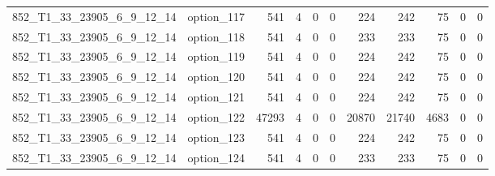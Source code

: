 \begin{tabular}{llrrrrrrrrr}
852\_T1\_33\_23905\_6\_9\_12\_14 & option\_117 & 541 & 4 & 0 & 0 & 224 & 242 & 75 & 0 & 0 \\
852\_T1\_33\_23905\_6\_9\_12\_14 & option\_118 & 541 & 4 & 0 & 0 & 233 & 233 & 75 & 0 & 0 \\
852\_T1\_33\_23905\_6\_9\_12\_14 & option\_119 & 541 & 4 & 0 & 0 & 224 & 242 & 75 & 0 & 0 \\
852\_T1\_33\_23905\_6\_9\_12\_14 & option\_120 & 541 & 4 & 0 & 0 & 224 & 242 & 75 & 0 & 0 \\
852\_T1\_33\_23905\_6\_9\_12\_14 & option\_121 & 541 & 4 & 0 & 0 & 224 & 242 & 75 & 0 & 0 \\
852\_T1\_33\_23905\_6\_9\_12\_14 & option\_122 & 47293 & 4 & 0 & 0 & 20870 & 21740 & 4683 & 0 & 0 \\
852\_T1\_33\_23905\_6\_9\_12\_14 & option\_123 & 541 & 4 & 0 & 0 & 224 & 242 & 75 & 0 & 0 \\
852\_T1\_33\_23905\_6\_9\_12\_14 & option\_124 & 541 & 4 & 0 & 0 & 233 & 233 & 75 & 0 & 0 \\
\bottomrule
\end{tabular}
